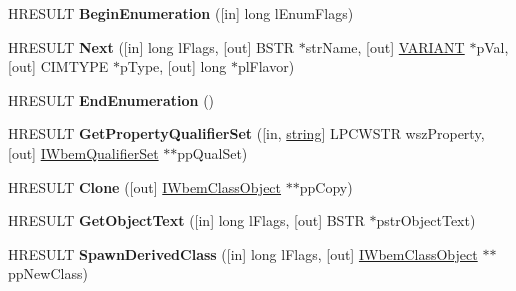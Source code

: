 \begin{DoxyCompactItemize}
\mbox{\label{interface_i_wbem_class_object_a1f6063caacc4c5ce110ac3e4a279de85}} 
H\+R\+E\+S\+U\+LT {\bfseries Begin\+Enumeration} (\mbox{[}in\mbox{]} long l\+Enum\+Flags)
\item 
\mbox{\label{interface_i_wbem_class_object_a57e6981168368707ff260bf10240f711}} 
H\+R\+E\+S\+U\+LT {\bfseries Next} (\mbox{[}in\mbox{]} long l\+Flags, \mbox{[}out\mbox{]} B\+S\+TR $\ast$str\+Name, \mbox{[}out\mbox{]} \hyperlink{structtag_v_a_r_i_a_n_t}{V\+A\+R\+I\+A\+NT} $\ast$p\+Val, \mbox{[}out\mbox{]} C\+I\+M\+T\+Y\+PE $\ast$p\+Type, \mbox{[}out\mbox{]} long $\ast$pl\+Flavor)
\item 
\mbox{\label{interface_i_wbem_class_object_a9fc5db821b9d99b6346657d1bcd4c466}} 
H\+R\+E\+S\+U\+LT {\bfseries End\+Enumeration} ()
\item 
\mbox{\label{interface_i_wbem_class_object_a42a56c207e4403b411230f4938de7599}} 
H\+R\+E\+S\+U\+LT {\bfseries Get\+Property\+Qualifier\+Set} (\mbox{[}in, \hyperlink{structstring}{string}\mbox{]} L\+P\+C\+W\+S\+TR wsz\+Property, \mbox{[}out\mbox{]} \hyperlink{interface_i_wbem_qualifier_set}{I\+Wbem\+Qualifier\+Set} $\ast$$\ast$pp\+Qual\+Set)
\item 
\mbox{\label{interface_i_wbem_class_object_a8ae694ffe98b34392036e687a03ab5f7}} 
H\+R\+E\+S\+U\+LT {\bfseries Clone} (\mbox{[}out\mbox{]} \hyperlink{interface_i_wbem_class_object}{I\+Wbem\+Class\+Object} $\ast$$\ast$pp\+Copy)
\item 
\mbox{\label{interface_i_wbem_class_object_a5a9784cadd8180f1d999c4d8874dada8}} 
H\+R\+E\+S\+U\+LT {\bfseries Get\+Object\+Text} (\mbox{[}in\mbox{]} long l\+Flags, \mbox{[}out\mbox{]} B\+S\+TR $\ast$pstr\+Object\+Text)
\item 
\mbox{\label{interface_i_wbem_class_object_a289a494654d558d31cef4e395d08530c}} 
H\+R\+E\+S\+U\+LT {\bfseries Spawn\+Derived\+Class} (\mbox{[}in\mbox{]} long l\+Flags, \mbox{[}out\mbox{]} \hyperlink{interface_i_wbem_class_object}{I\+Wbem\+Class\+Object} $\ast$$\ast$pp\+New\+Class)
\item 
$$
\end{DoxyCompactItemize}
